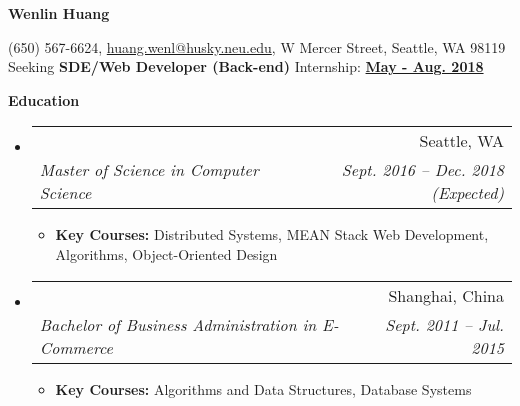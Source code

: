 \documentclass[letterpaper,11pt]{article}
\makeatletter
\newcommand{\resitem}[1]{\item #1 \vspace{-2pt}}
\newcommand{\resheading}[1]{{\large \colorbox{mygrey}{\begin{minipage}{\textwidth}{\textbf{#1 \vphantom{p\^{E}}}}\end{minipage}}}}
\newcommand{\ressubheading}[4]{
\begin{tabular*}{6.5in}{l@{\extracolsep{\fill}}r}
    \textbf{#1} & #2 \\
    \textit{#3} & \textit{#4} \\
\end{tabular*}\vspace{-6pt}}
\makeatother
\begin{document}

    \centering\textbf{\huge Wenlin Huang}\\ \vspace{0.1in}

    (650) 567-6624,
    \href {mailto:huang.wenl@husky.neu.edu} {huang.wenl@husky.neu.edu},
    {W Mercer Street, Seattle, WA 98119} \\

    {Seeking
    \textbf{SDE/Web Developer ({Back-end})} Internship:
    \textbf{\underline{May - Aug. 2018}}}



    \resheading{Education}
    \begin{itemize}
        \item[]
        \ressubheading  %
        {\href
        {http://www.northeastern.edu/seattle/}
        {Northeastern University - Seattle}
        }
        {Seattle, WA}
        {Master of Science in Computer Science}
        {Sept. 2016 -- Dec. 2018 (Expected)}
        {\footnotesize
        \begin{itemize}
            \resitem{
            \textbf{Key Courses:} Distributed Systems, MEAN Stack Web Development,
            Algorithms, Object-Oriented Design
            }
        \end{itemize}
        }

        \item[]
        \ressubheading
        {\href
        {http://www.shnu.edu.cn/}
        {Shanghai Normal University}
        }
        {Shanghai, China}
        {Bachelor of Business Administration in E-Commerce}
        {Sept. 2011 -- Jul. 2015}
        {
        \footnotesize
        \begin{itemize}
            \resitem{
            \textbf{Key Courses:} Algorithms and Data Structures, Database Systems
            }
        \end{itemize}
        }

    \end{itemize}
\end{document}
